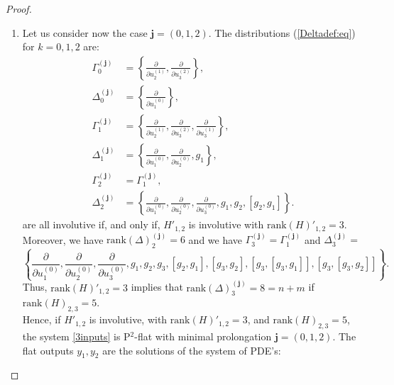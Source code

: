 \documentclass[10pt,a4paper]{amsart}
\newcommand{\bj}{\mathbf{j}}
\newcommand{\ddu}[2]{\frac{\partial}{\partial u_{#1}^{(#2)}}}
\newcommand{\mbf}[1]{\mathbf{#1}}
\newcommand{\rk}[1]{\mathrm{rank} \left(#1\right)}
\begin{document}
\begin{proof}
\begin{enumerate}
Therefore, the system is P$^2$-flat with an order one prolongation of $u_3$ and the flat outputs $y_1,y_2,y_3$ are the solutions of the system of PDE's:

\[ \left< G_{1}^{(\bj)},  dy_{i} \right>= 0 \]

or, equivalently, the flat outputs must be independent of $u_1^{(0)},u_2^{(0)},u_3^{(0)}$ and must be the solution of the system of PDE's

\[ \left< H_{0,2},  dy_{i} \right>= 0 \]

Remark that, by the Frobenius theorem, there exists $y_1,y_2,y_3$ independent solutions of this system of linear partial differential equations since, by assumption, $H_{0,2}$ is an involutive distribution.


\item Let us consider now the case $\mbf{j}=(0,1,2)$. The distributions (\ref{Deltadef:eq}) for $k=0,1,2$ are:
\begin{equation}
\begin{aligned}
\Gamma_{0}^{(\mbf{j})} &= \left\{ \ddu{2}{1},\ddu{3}{2} \right\},\\
\Delta_{0}^{(\mbf{j})} &= \left\{\ddu{1}{0}\right\},\\
\Gamma_{1}^{(\mbf{j})} &= \left\{ \ddu{2}{1},\ddu{3}{2}, \ddu{3}{1} \right\},\\
\Delta_{1}^{(\mbf{j})} &= \left\{\ddu{1}{0}, \ddu{2}{0},  g_{1} \right\},\\
\Gamma_{2}^{(\mbf{j})} &= \Gamma_{1}^{(\mbf{j})}, \\
\Delta_{2}^{(\mbf{j})} &= \left\{\ddu{1}{0}, \ddu{2}{0}, \ddu{3}{0}, g_{1}, g_{2}, [g_{2},g_{1}]\right\}.
\end{aligned}
\end{equation}
are all involutive if, and only if, $H'_{1,2}$ is involutive with $\rk H'_{1,2} = 3$.  Moreover, we have $\rk \Delta_{2}^{(\mbf{j})} = 6$ and we have $\Gamma_{3}^{(\mbf{j})} = \Gamma_{1}^{(\mbf{j})}$ and $\Delta_{3}^{(\mbf{j})}=$
$$\left\{\ddu{1}{0}, \ddu{2}{0}, \ddu{3}{0}, g_{1}, g_{2}, g_{3}, [g_{2},g_{1}], [g_{3},g_{2}], [g_{3},[g_{3},g_{1}]], [g_{3},[g_{3},g_{2}]] \right\}.$$
Thus, $\rk H'_{1,2} = 3$ implies that  $\rk \Delta_{3}^{(\mbf{j})} = 8= n+m$ if $\rk H_{2,3} = 5$. \\
Hence, if $H'_{1,2}$ is involutive, with $\rk H' _{1,2} = 3$, and $\rk H_{2,3} = 5$, the system \eqref{3inputs} is P$^{2}$-flat with minimal prolongation $\mbf{j}=(0,1,2)$. The flat outputs $y_1,y_2$ are the solutions of the system of PDE's:


\end{enumerate}
\end{proof}
\end{document}
